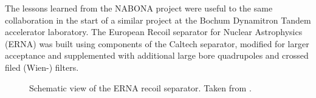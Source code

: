 The lessons learned from the NABONA project were useful to the same collaboration in the start of a similar project at the Bochum Dynamitron Tandem accelerator laboratory. The European Recoil separator for Nuclear Astrophysics (ERNA) was built using components of the Caltech separator, modified for larger acceptance and supplemented with additional large bore quadrupoles and crossed filed (Wien-) filters.
\begin{figure}
\caption{Schematic view of the ERNA recoil separator. Taken from \cite{dile08}.}
\label{fig:erna}       %
\end{figure}
